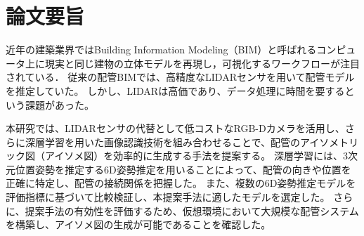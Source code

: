 \section*{論文要旨}

近年の建築業界ではBuilding Information Modeling（BIM）と呼ばれるコンピュータ上に現実と同じ建物の立体モデルを再現し，可視化するワークフローが注目されている．
従来の配管BIMでは、高精度なLIDARセンサを用いて配管モデルを推定していた。
しかし、LIDARは高価であり、データ処理に時間を要するという課題があった。

本研究では、LIDARセンサの代替として低コストなRGB-Dカメラを活用し、さらに深層学習を用いた画像認識技術を組み合わせることで、配管のアイソメトリック図（アイソメ図）を効率的に生成する手法を提案する。
深層学習には、3次元位置姿勢を推定する6D姿勢推定を用いることによって、配管の向きや位置を正確に特定し、配管の接続関係を把握した。
また、複数の6D姿勢推定モデルを評価指標に基づいて比較検証し、本提案手法に適したモデルを選定した。
さらに、提案手法の有効性を評価するため、仮想環境において大規模な配管システムを構築し、アイソメ図の生成が可能であることを確認した。

